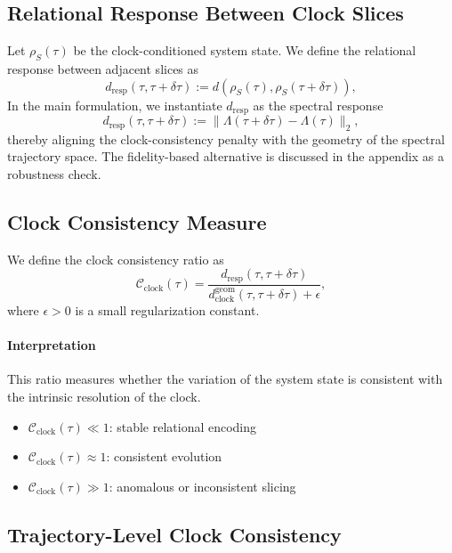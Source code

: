 \documentclass[11pt,a4paper]{article}
\theoremstyle{definition}
\theoremstyle{remark}
\begin{document}
\subsection{Relational Response Between Clock Slices}

Let $\rho_S(\tau)$ be the clock-conditioned system state.
We define the relational response between adjacent slices as
\begin{equation}
d_{\mathrm{resp}}(\tau,\tau+\delta\tau)
:=
d\!\left(
\rho_S(\tau), \rho_S(\tau+\delta\tau)
\right),
\end{equation}
In the main formulation, we instantiate $d_{\mathrm{resp}}$ as 
the spectral response
\[
d_{\mathrm{resp}}(\tau, \tau+\delta\tau) 
:= \|\Lambda(\tau+\delta\tau) - \Lambda(\tau)\|_2,
\]
thereby aligning the clock-consistency penalty with the geometry 
of the spectral trajectory space. The fidelity-based alternative 
is discussed in the appendix as a robustness check.

\subsection{Clock Consistency Measure}

We define the clock consistency ratio as
\begin{equation}
\mathcal{C}_{\mathrm{clock}}(\tau)
=
\frac{
d_{\mathrm{resp}}(\tau,\tau+\delta\tau)
}{
d_{\mathrm{clock}}^{\mathrm{geom}}(\tau,\tau+\delta\tau)
+ \epsilon
},
\end{equation}
where $\epsilon > 0$ is a small regularization constant.

\paragraph{Interpretation}
This ratio measures whether the variation of the system state is consistent with the intrinsic resolution of the clock.

\begin{itemize}
\item $\mathcal{C}_{\mathrm{clock}}(\tau) \ll 1$: stable relational encoding
\item $\mathcal{C}_{\mathrm{clock}}(\tau) \approx 1$: consistent evolution
\item $\mathcal{C}_{\mathrm{clock}}(\tau) \gg 1$: anomalous or inconsistent slicing
\end{itemize}

\subsection{Trajectory-Level Clock Consistency}
\end{document}
